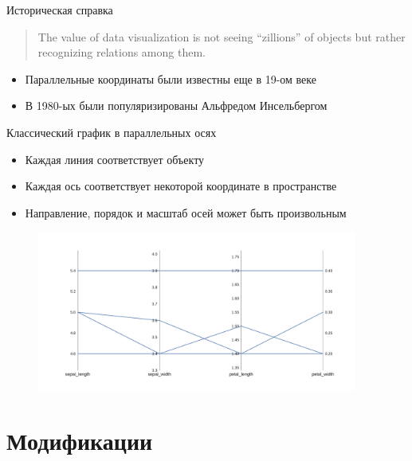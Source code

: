 \documentclass[fleqn, xcolor=x11names]{beamer}
\begin{document}
\begin{frame}{Историческая справка}
    \begin{quote}
        The value of data visualization is not seeing “zillions” 
    of objects but rather recognizing relations among them.
    \end{quote}
    \vspace{30px}
    \begin{itemize}
        \item Параллельные координаты были известны еще в 19-ом веке
        \item В 1980-ых были популяризированы Альфредом Инсельбергом
    \end{itemize}
\end{frame}

\begin{frame}{Классический график в параллельных осях}
    
    \vspace{10pt}

    \begin{itemize}
        \item Каждая линия соответствует объекту
        \item Каждая ось соответствует некоторой координате в пространстве
        \item Направление, порядок и масштаб осей может быть произвольным
    \end{itemize}

    \vspace{-5pt}

    \begin{figure}[htb]
        \centering
        \includegraphics[width=10.5cm]{classic_pc.pdf}
    \end{figure}

\end{frame}

\section{Модификации}
\end{document}
